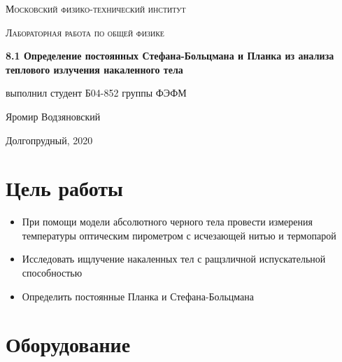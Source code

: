 \documentclass[a4paper]{article}
\begin{document}
\graphicspath{ {pictures/} }

\begin{titlepage}
	\centering
	\vspace{5cm}
    {\scshape\LARGE Московский физико-технический институт\par}
	\vspace{5cm}
	{\scshape\Large Лабораторная работа по общей физике \par}
	\vspace{1cm}
    {\huge\bfseries  8.1 Определение постоянных Стефана-Больцмана и Планка из анализа
    теплового излучения накаленного тела \par}
	\vspace{1cm}
	\vfill
    \begin{flushright}
        {\large выполнил студент Б04-852 группы ФЭФМ}\par
        \vspace{0.3cm}
        {\LARGE Яромир Водзяновский}
    \end{flushright}
	\vfill
Долгопрудный, 2020
\end{titlepage}

\pagestyle{fancy} 
\fancyhead[C]{}
\fancyfoot[C]{ \noindent\rule{\textwidth}{0.4pt} \thepage }

\tableofcontents

\newpage



\section{Цель работы}

\begin{itemize}
    \item При помощи модели абсолютного черного тела провести измерения температуры оптическим пирометром
    с исчезающей нитью и термопарой
    \item Исследовать ищлучение накаленных тел с ращзличной испускательной способностью
    \item Определить постоянные Планка и Стефана-Больцмана
\end{itemize}



\section{Оборудование}
\end{document}
